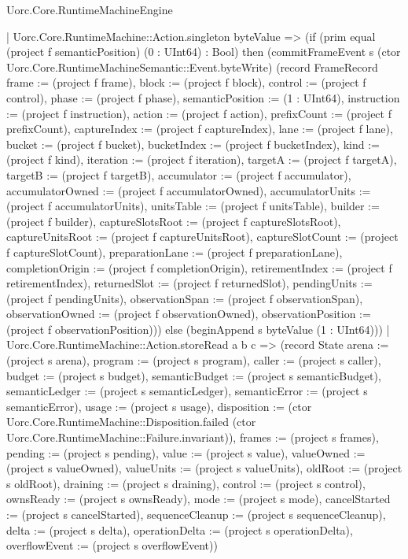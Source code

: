 \begin{lexlean}{Uorc.Core.RuntimeMachineEngine}
\begin{semanticmodule}
{      | Uorc.Core.RuntimeMachine::Action.singleton byteValue => (if (prim equal (project f semanticPosition) (0 : UInt64) : Bool) then (commitFrameEvent s (ctor Uorc.Core.RuntimeMachineSemantic::Event.byteWrite) (record FrameRecord {frame := (project f frame), block := (project f block), control := (project f control), phase := (project f phase), semanticPosition := (1 : UInt64), instruction := (project f instruction), action := (project f action), prefixCount := (project f prefixCount), captureIndex := (project f captureIndex), lane := (project f lane), bucket := (project f bucket), bucketIndex := (project f bucketIndex), kind := (project f kind), iteration := (project f iteration), targetA := (project f targetA), targetB := (project f targetB), accumulator := (project f accumulator), accumulatorOwned := (project f accumulatorOwned), accumulatorUnits := (project f accumulatorUnits), unitsTable := (project f unitsTable), builder := (project f builder), captureSlotsRoot := (project f captureSlotsRoot), captureUnitsRoot := (project f captureUnitsRoot), captureSlotCount := (project f captureSlotCount), preparationLane := (project f preparationLane), completionOrigin := (project f completionOrigin), retirementIndex := (project f retirementIndex), returnedSlot := (project f returnedSlot), pendingUnits := (project f pendingUnits), observationSpan := (project f observationSpan), observationOwned := (project f observationOwned), observationPosition := (project f observationPosition)})) else (beginAppend s byteValue (1 : UInt64)))
      | Uorc.Core.RuntimeMachine::Action.storeRead a b c => (record State {arena := (project s arena), program := (project s program), caller := (project s caller), budget := (project s budget), semanticBudget := (project s semanticBudget), semanticLedger := (project s semanticLedger), semanticError := (project s semanticError), usage := (project s usage), disposition := (ctor Uorc.Core.RuntimeMachine::Disposition.failed (ctor Uorc.Core.RuntimeMachine::Failure.invariant)), frames := (project s frames), pending := (project s pending), value := (project s value), valueOwned := (project s valueOwned), valueUnits := (project s valueUnits), oldRoot := (project s oldRoot), draining := (project s draining), control := (project s control), ownsReady := (project s ownsReady), mode := (project s mode), cancelStarted := (project s cancelStarted), sequenceCleanup := (project s sequenceCleanup), delta := (project s delta), operationDelta := (project s operationDelta), overflowEvent := (project s overflowEvent)})
}
\end{semanticmodule}
\end{lexlean}
